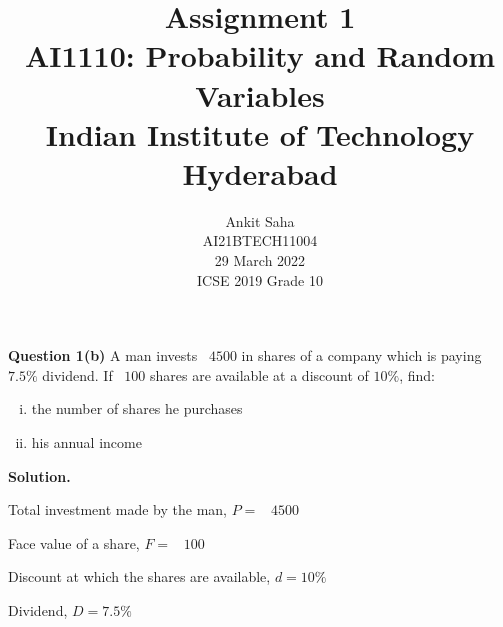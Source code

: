 \documentclass[journal,12pt,onecolumn]{IEEEtran}
\title{Assignment 1 \\ \Large AI1110: Probability and Random Variables \\ \large Indian Institute of Technology Hyderabad}
\author{Ankit Saha \\ \normalsize AI21BTECH11004 \\ \vspace*{20pt} \normalsize  29 March 2022 \\ \vspace*{20pt} \Large ICSE 2019 Grade 10}
\begin{document}
	\maketitle
	
	\textbf{Question 1(b)} 
	A man invests \rupee~$4500$ in shares of a company which is paying $7.5\%$ dividend. If \rupee~$100$ shares are available at a discount of $10\%$, find:
	\begin{enumerate}[(i)]
		\item the number of shares he purchases
		\item his annual income
	\end{enumerate}
	
	\vspace*{10pt}
	
	\textbf{Solution.}
	
	Total investment made by the man, $P = $ \rupee~$4500$
	
	Face value of a share, $F = $ \rupee~$100$
	
	Discount at which the shares are available, $d = 10\%$
	
	Dividend, $D = 7.5\%$
	
	\vspace*{5pt}	
	
\end{document}
